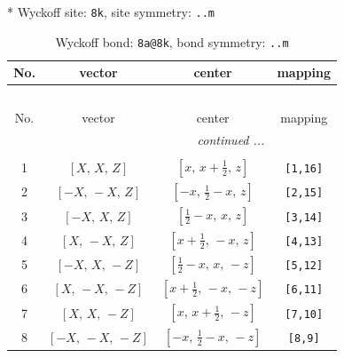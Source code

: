 \documentclass[fleqn,8pt]{jsarticle}
\begin{document}
* Wyckoff site: {\tt 8k}, site symmetry: {\tt ..m}
\renewcommand{\arraystretch}{1.2}
\begin{longtable}{cccc}
\caption{Wyckoff bond: {\tt 8a@8k}, bond symmetry: {\tt ..m}}
 \\
 \hline \hline
No. & vector & center & mapping \\ \hline \endfirsthead

\multicolumn{3}{l}{\tablename\ \thetable{}} \\
 \hline \hline
No. & vector & center & mapping \\ \hline \endhead

 \hline \hline
\multicolumn{3}{r}{\footnotesize\it continued ...} \\ \endfoot

 \hline \hline
\multicolumn{3}{r}{} \\ \endlastfoot

1 & $\left[ X,\, X,\, Z \right]$ & $\left[ x,\, x + \frac{1}{2},\, z \right]$ & {\tt [1,16]} \\ \hline
2 & $\left[ - X,\, - X,\, Z \right]$ & $\left[ - x,\, \frac{1}{2} - x,\, z \right]$ & {\tt [2,15]} \\ \hline
3 & $\left[ - X,\, X,\, Z \right]$ & $\left[ \frac{1}{2} - x,\, x,\, z \right]$ & {\tt [3,14]} \\ \hline
4 & $\left[ X,\, - X,\, Z \right]$ & $\left[ x + \frac{1}{2},\, - x,\, z \right]$ & {\tt [4,13]} \\ \hline
5 & $\left[ - X,\, X,\, - Z \right]$ & $\left[ \frac{1}{2} - x,\, x,\, - z \right]$ & {\tt [5,12]} \\ \hline
6 & $\left[ X,\, - X,\, - Z \right]$ & $\left[ x + \frac{1}{2},\, - x,\, - z \right]$ & {\tt [6,11]} \\ \hline
7 & $\left[ X,\, X,\, - Z \right]$ & $\left[ x,\, x + \frac{1}{2},\, - z \right]$ & {\tt [7,10]} \\ \hline
8 & $\left[ - X,\, - X,\, - Z \right]$ & $\left[ - x,\, \frac{1}{2} - x,\, - z \right]$ & {\tt [8,9]} \\
\end{longtable}
\renewcommand{\arraystretch}{1.2}
\end{document}
